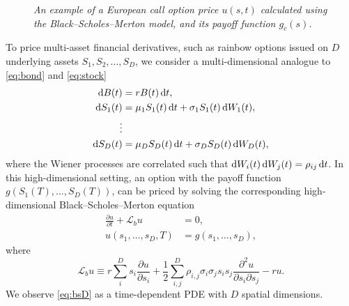 \documentclass{UUThesisTemplate}
\begin{document}
\begin{figure}[H]
\centering

\caption{\emph{An example of a European call option price $u(s,t)$ calculated using the Black--Scholes--Merton model, and its payoff function $g_c(s)$.}}
\label{fig:eucallpayoff}
\end{figure}

%
%

\par
To price multi-asset financial derivatives, such as rainbow options issued on $D$ underlying assets $S_1,S_2,\ldots,S_D$, we consider a multi-dimensional analogue to \eqref{eq:bond} and \eqref{eq:stock}
\begin{align}
\dif B(t)&=rB(t)\dif t, \nonumber \\
\dif S_1(t)&=\mu_1 S_1(t)\dif t+\sigma_1 S_1(t)\dif W_1(t), \nonumber \\
\vdots \nonumber \\ 
\dif S_D(t)&=\mu_D S_D(t)\dif t+\sigma_D S_D(t)\dif W_D(t), \label{eq:multi}
\end{align}
where the Wiener processes are correlated such that $\dif W_i(t)\dif W_j(t)=\rho_{ij}\dif t$. In this high-dimensional setting, an option with the payoff function $g(S_1(T),\ldots,S_D(T))$, can be priced by solving the corresponding high-dimensional Black--Scholes--Merton equation
\begin{align}
\frac{\partial u}{\partial t}+\mathcal{L}_b u&=0, \nonumber \\
u(s_1,\ldots,s_D,T)&=g(s_1,\ldots,s_D), \label{eq:bsD}
\end{align}
where
\begin{equation}
\label{eqBSop}
\mathcal{L}_b u \equiv r\sum\limits_{i}^{D}s_i\frac{\partial u}{\partial{s_i}}+\frac{1}{2}\sum\limits_{i,j}^{D}\rho_{i,j}\sigma_i\sigma_j s_is_j\frac{\partial^2u}{\partial s_i \partial s_j}-ru.
\end{equation}
We observe \eqref{eq:bsD} as a time-dependent PDE with $D$ spatial dimensions.
\end{document}

